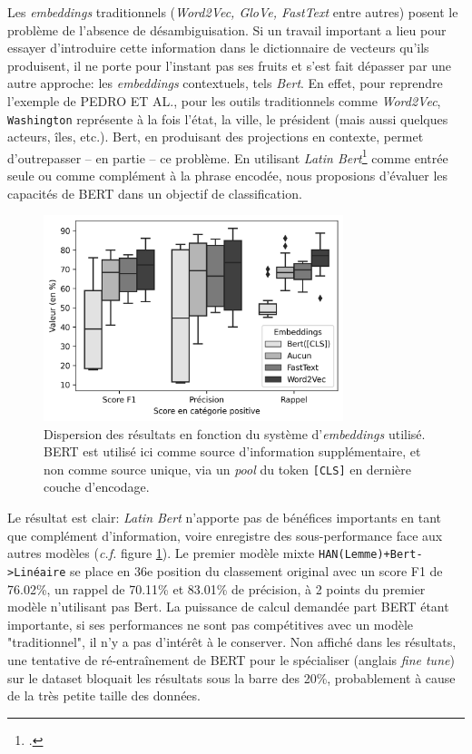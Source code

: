 Les \textit{embeddings} traditionnels (\textit{Word2Vec, GloVe, FastText} entre autres) posent le problème de l'absence de désambiguisation. Si un travail important a lieu pour essayer d'introduire cette information dans le dictionnaire de vecteurs qu'ils produisent, il ne porte pour l'instant pas ses fruits et s'est fait dépasser par une autre approche: les \textit{embeddings} contextuels, tels \textit{Bert}. En effet, pour reprendre l'exemple de PEDRO ET AL., pour les outils traditionnels comme \textit{Word2Vec}, \texttt{Washington} représente à la fois l'état, la ville, le président (mais aussi quelques acteurs, îles, etc.). Bert, en produisant des projections en contexte, permet d'outrepasser -- en partie -- ce problème. En utilisant \textit{Latin Bert}\footcite{bamman2020latin} comme entrée seule ou comme complément à la phrase encodée, nous proposions d'évaluer les capacités de BERT dans un objectif de classification.

\begin{figure}[t]
    \centering
    \includegraphics[height=6cm]{figures/chap4/scoreDispersionEmbeddings.png}
    \caption{Dispersion des résultats en fonction du système d'\textit{embeddings} utilisé. BERT est utilisé ici comme source  d'information supplémentaire, et non comme source unique, via un \textit{pool} du token \texttt{[CLS]} en dernière couche d'encodage.}
    \label{fig:chap4:bert-dispersion-fusion}
\end{figure}

Le résultat est clair: \textit{Latin Bert} n'apporte pas de bénéfices importants en tant que complément d'information, voire enregistre des sous-performance face aux autres modèles (\textit{c.f.} figure \ref{fig:chap4:bert-dispersion-fusion}). Le premier modèle mixte \texttt{HAN(Lemme)+Bert->Linéaire} se place en 36e position du classement original avec un score F1 de 76.02\%, un rappel de 70.11\% et 83.01\% de précision, à 2 points du premier modèle n'utilisant pas Bert. La puissance de calcul demandée part BERT étant importante, si ses performances ne sont pas compétitives avec un modèle "traditionnel", il n'y a pas d'intérêt à le conserver. Non affiché dans les résultats, une tentative de ré-entraînement de BERT pour le spécialiser (anglais \textit{fine tune}) sur le dataset bloquait les résultats sous la barre des 20\%, probablement à cause de la très petite taille des données.

